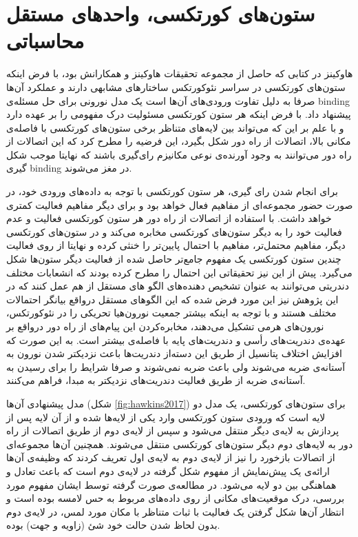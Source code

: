 \documentclass[12pt]{report}
\begin{document}
	\section{ستون‌های کورتکسی، واحد‌های مستقل محاسباتی}
	هاوکینز در کتابی \cite{Hawkins2021-rq} که حاصل از مجموعه تحقیقات هاوکینز و همکارانش
	\cite{Hawkins2016, Hawkins2017, Lewis2019}
	بود، با فرض اینکه ستون‌های کورتکسی در سراسر نئوکورتکس ساختار‌های مشابهی دارند و عملکرد آن‌ها صرفا به دلیل تفاوت ورودی‌های آن‌ها است \cite{Mountcastle1978} یک مدل نورونی برای حل مسئله‌ی \gls{binding} پیشنهاد داد. با فرض اینکه هر ستون کورتکسی مسئولیت درک مفهومی را بر عهده دارد و با علم بر این که می‌تواند بین لایه‌های متناظر برخی ستون‌های کورتکسی با فاصله‌ی مکانی بالا، اتصالات از راه دور شکل بگیرد، این فرضیه را مطرح کرد که این اتصالات از راه دور می‌توانند به وجود آورنده‌ی نوعی مکانیزم رای‌گیری باشند که نهایتا موجب شکل گیری \gls{binding} در مغز می‌شوند.
	
	برای انجام شدن رای گیری، هر ستون کورتکسی با توجه به داده‌های ورودی خود، در صورت حضور مجموعه‌ای از مفاهیم فعال خواهد بود و برای دیگر مفاهیم فعالیت کمتری خواهد داشت. با استفاده از اتصالات از راه دور هر ستون کورتکسی فعالیت و عدم فعالیت خود را به دیگر ستون‌های کورتکسی مخابره می‌کند و در ستون‌های کورتکسی دیگر، مفاهیم محتمل‌تر، مفاهیم با احتمال پایین‌تر را خنثی کرده و نهایتا از روی فعالیت چندین ستون کورتکسی یک مفهوم جامع‌تر حاصل شده از فعالیت دیگر ستون‌ها شکل می‌گیرد. پیش از این نیز تحقیقاتی این احتمال را مطرح کرده بودند که انشعابات مختلف دندریتی می‌توانند به عنوان تشخیص دهنده‌های الگو های مستقل از هم عمل کنند \cite{POIRAZI2003989, Polsky2004} که در این پژوهش نیز این مورد فرض شده که این الگو‌های مستقل درواقع بیانگر احتمالات مختلف هستند و با توجه به اینکه بیشتر جمعیت نورون‌هیا تحریکی را در نئوکورتکس، نورون‌های هرمی تشکیل می‌دهند، مخابره‌کردن این پیام‌های از راه دور درواقع بر عهده‌ی دندریت‌های رأسی و دندریت‌های پایه‌ با فاصله‌ی بیشتر است. به این صورت که افزایش اختلاف پتانسیل از طریق این دسته‌از دندریت‌ها باعث نزدیکتر شدن نورون به آستانه‌ی ضربه می‌شوند ولی باعث ضربه نمی‌شوند و صرفا شرایط را برای رسیدن به آستانه‌ی ضربه از طریق فعالیت دندریت‌های نزدیکتر به مبدا، فراهم می‌کنند.
	
	مدل پیشنهادی آن‌ها (شکل \ref{fig:hawkins2017}) برای ستون‌های کورتکسی، یک مدل دو لایه‌ است که ورودی ستون کورتکسی وارد یکی از لایه‌ها شده و از آن لایه پس از پردازش به لایه‌ی دیگر منتقل می‌شود و سپس از لایه‌‌ی دوم از طریق اتصالات از راه دور به لا‌‌یه‌های دوم دیگر ستون‌های کورتکسی منتقل می‌شوند. همچنین آن‌ها مجموعه‌ای از اتصالات بازخورد را نیز از لایه‌ی دوم به لا‌یه‌ی اول تعریف کردند که وظیفه‌ی آن‌ها ارائه‌ی یک پیش‌نمایش از مفهوم‌ شکل گرفته در لايه‌ی دوم است که باعث تعادل و هماهنگی بین دو لایه‌ می‌شود. در مطالعه‌ی صورت گرفته توسط ایشان\cite{Hawkins2017} مفهوم مورد بررسی، درک موقعیت‌های مکانی از روی داده‌های مربوط به حس لامسه بوده است و انتظار آن‌ها شکل گرفتن یک فعالیت با ثبات متناظر با مکان مورد لمس، در لایه‌ی دوم بدون لحاظ شدن حالت خود شئ (زاویه و جهت) بوده. 
	
\end{document}
